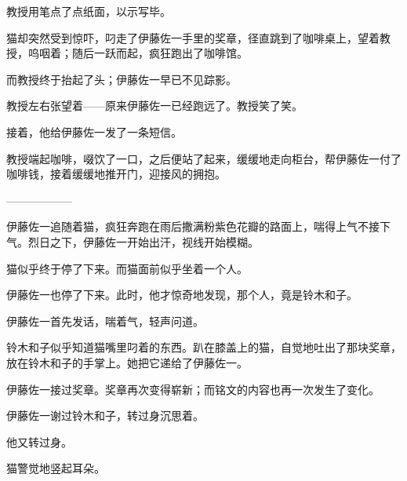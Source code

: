 
教授用笔点了点纸面，以示写毕。


猫却突然受到惊吓，叼走了伊藤佐一手里的奖章，径直跳到了咖啡桌上，望着教授，呜咽着；随后一跃而起，疯狂跑出了咖啡馆。

而教授终于抬起了头；伊藤佐一早已不见踪影。

教授左右张望着——原来伊藤佐一已经跑远了。教授笑了笑。


接着，他给伊藤佐一发了一条短信。


教授端起咖啡，啜饮了一口，之后便站了起来，缓缓地走向柜台，帮伊藤佐一付了咖啡钱，接着缓缓地推开门，迎接风的拥抱。

\begin{center}
——————
\end{center}

伊藤佐一追随着猫，疯狂奔跑在雨后撒满粉紫色花瓣的路面上，喘得上气不接下气。烈日之下，伊藤佐一开始出汗，视线开始模糊。

猫似乎终于停了下来。而猫面前似乎坐着一个人。

伊藤佐一也停了下来。此时，他才惊奇地发现，那个人，竟是铃木和子。

伊藤佐一首先发话，喘着气，轻声问道。






铃木和子似乎知道猫嘴里叼着的东西。趴在膝盖上的猫，自觉地吐出了那块奖章，放在铃木和子的手掌上。她把它递给了伊藤佐一。

伊藤佐一接过奖章。奖章再次变得崭新；而铭文的内容也再一次发生了变化。


伊藤佐一谢过铃木和子，转过身沉思着。

他又转过身。


猫警觉地竖起耳朵。

